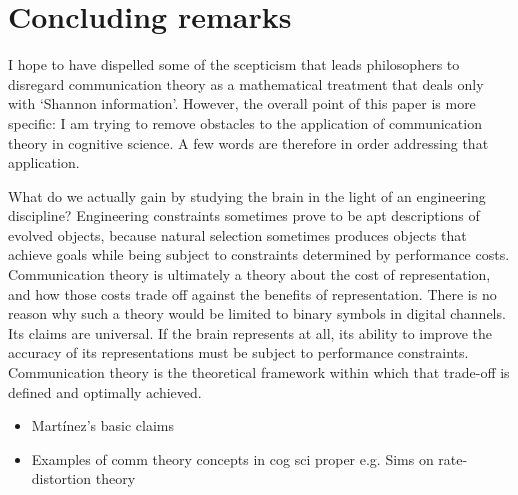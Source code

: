 \section{Concluding remarks}\label{sec:conclusion}

I hope to have dispelled some of the scepticism that leads philosophers to disregard communication theory as a mathematical treatment that deals only with `Shannon information'.
However, the overall point of this paper is more specific: I am trying to remove obstacles to the application of communication theory in cognitive science.
A few words are therefore in order addressing that application.

What do we actually gain by studying the brain in the light of an engineering discipline?
Engineering constraints sometimes prove to be apt descriptions of evolved objects, because natural selection sometimes produces objects that achieve goals while being subject to constraints determined by performance costs.
Communication theory is ultimately a theory about the cost of representation, and how those costs trade off against the benefits of representation.
There is no reason why such a theory would be limited to binary symbols in digital channels.
Its claims are universal.
If the brain represents at all, its ability to improve the accuracy of its representations must be subject to performance constraints.
Communication theory is the theoretical framework within which that trade-off is defined and optimally achieved.

\begin{itemize}
    \item Mart\'{i}nez's basic claims
    \item Examples of comm theory concepts in cog sci proper e.g. Sims on rate-distortion theory
\end{itemize}